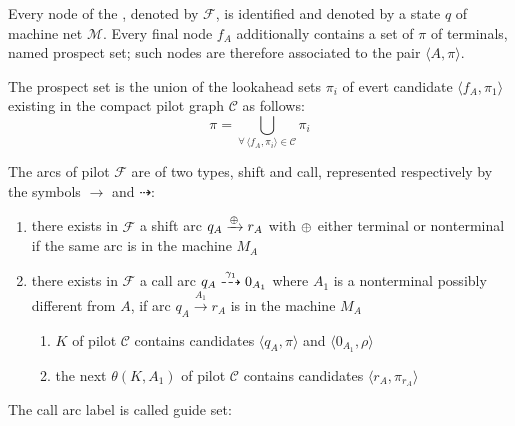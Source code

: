\documentclass[english]{article}
\begin{document}
\bigskip
Every node of the \PCFG, denoted by \(\mathcal{F}\), is identified and denoted by a state \(q\) of machine net \(\mathcal{M}\).
Every final node \(f_A\) additionally contains a set of \(\pi\) of terminals, named prospect set;
such nodes are therefore associated to the pair \(\langle A, \pi \rangle\).

The prospect set is the union of the lookahead sets \(\pi_i\) of evert candidate \(\langle f_A, \pi_1\rangle\) existing in the compact pilot graph \(\mathcal{C}\) as follows:
\[ \pi = \bigcup_{\forall \, \langle f_A, \pi_i \rangle \in \mathcal{C}} \pi_i \]

\bigskip
The arcs of pilot \(\mathcal{F}\) are of two types, shift and call, represented respectively by the symbols \(\rightarrow\) and \(\dashrightarrow\):

\begin{enumerate}
  \item there exists in \(\mathcal{F}\) a shift arc \(q_A \xrightarrow{\oplus} r_A\) with \(\oplus\) either terminal or nonterminal if the same arc is in the machine \(M_A\)
  \item there exists in \(\mathcal{F}\) a call arc \(q_A \stackrel{\gamma_1}{\dashrightarrow} 0_{A_1}\) where \(A_1\) is a nonterminal possibly different from \(A\), if arc \(q_A \xrightarrow{A_1} r_A\) is in the machine \(M_A\)
        \begin{enumerate}[label=\(\rightarrow\) necessary condition \arabic*., leftmargin=*, labelindent=2em, widest*=24]
          \item \mstate \(K\) of pilot \(\mathcal{C}\) contains candidates \(\langle q_A, \pi \rangle\) and \(\langle 0_{A_1}, \rho\rangle\)
          \item the next \mstate \(\theta(K, A_1)\) of pilot \(\mathcal{C}\) contains candidates \(\langle r_A, \pi_{r_A} \rangle\)
        \end{enumerate}
\end{enumerate}

\bigskip
The call arc label is called guide set:
\end{document}
